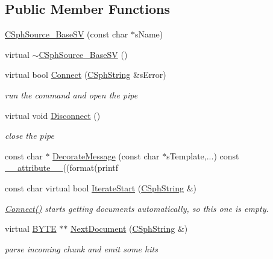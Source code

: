 \subsection*{Public Member Functions}
\begin{DoxyCompactItemize}
\item 
\hyperlink{classCSphSource__BaseSV_a27350bec60123de61cc0392808f61e4b}{C\-Sph\-Source\-\_\-\-Base\-S\-V} (const char $\ast$s\-Name)
\item 
virtual \hyperlink{classCSphSource__BaseSV_a911f235d9b65f48e81b06a8f80c19398}{$\sim$\-C\-Sph\-Source\-\_\-\-Base\-S\-V} ()
\item 
virtual bool \hyperlink{classCSphSource__BaseSV_a2d7bfaa58ed537c37f825c5e940677ff}{Connect} (\hyperlink{structCSphString}{C\-Sph\-String} \&s\-Error)
\begin{DoxyCompactList}\small\item\em run the command and open the pipe \end{DoxyCompactList}\item 
virtual void \hyperlink{classCSphSource__BaseSV_aa4c4b9d4a350c04b5258bd2d0bae12f1}{Disconnect} ()
\begin{DoxyCompactList}\small\item\em close the pipe \end{DoxyCompactList}\item 
const char $\ast$ \hyperlink{classCSphSource__BaseSV_a165580b52ec38afb87f15c3cad622b8b}{Decorate\-Message} (const char $\ast$s\-Template,...) const \hyperlink{sphinxstd_8h_a9d373a9b65ff25b2db84c07394e1c212}{\-\_\-\-\_\-attribute\-\_\-\-\_\-}((format(printf
\item 
const char virtual bool \hyperlink{classCSphSource__BaseSV_a5b2b2753b3280a4353f3c8b87265934c}{Iterate\-Start} (\hyperlink{structCSphString}{C\-Sph\-String} \&)
\begin{DoxyCompactList}\small\item\em \hyperlink{classCSphSource__BaseSV_a2d7bfaa58ed537c37f825c5e940677ff}{Connect()} starts getting documents automatically, so this one is empty. \end{DoxyCompactList}\item 
virtual \hyperlink{sphinxstd_8h_a4ae1dab0fb4b072a66584546209e7d58}{B\-Y\-T\-E} $\ast$$\ast$ \hyperlink{classCSphSource__BaseSV_a113962fbc82cffb84caf83a2b9009f06}{Next\-Document} (\hyperlink{structCSphString}{C\-Sph\-String} \&)
\begin{DoxyCompactList}\small\item\em parse incoming chunk and emit some hits \end{DoxyCompactList}\item 
$$
\end{DoxyCompactItemize}
